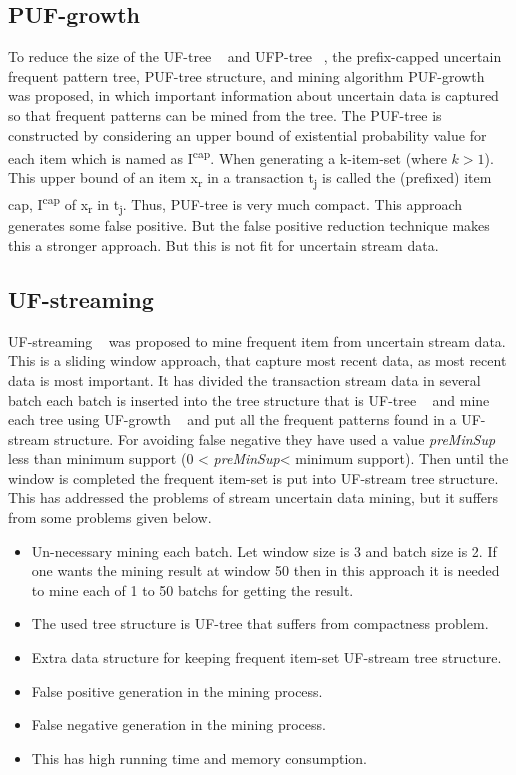     \subsection{PUF-growth}
    To reduce the size of the UF-tree ~\cite{uf_growth} and UFP-tree ~\cite{ufp_growth}, the preﬁx-capped uncertain frequent pattern tree, PUF-tree structure, and mining algorithm PUF-growth ~\cite{puf_growth} was proposed, in which important information about uncertain data is captured so that frequent patterns can be mined from the tree. The PUF-tree  is constructed by considering an upper bound of existential probability value for each item  which is named as I\textsuperscript{cap}. When generating a k-item-set (where $k>1$). This upper bound of an item x\textsubscript{r} in a transaction t\textsubscript{j} is called the (preﬁxed) item cap, I\textsuperscript{cap} of x\textsubscript{r} in t\textsubscript{j}. Thus, PUF-tree is very much compact. This approach generates some false positive. But the false positive reduction technique makes this a stronger approach. But this is not fit for uncertain stream data. 
    
    \subsection{UF-streaming}
    UF-streaming ~\cite{suf_growth} was proposed to mine frequent item from uncertain stream data. This is a sliding window approach, that capture most recent data, as most recent data is most important. It has divided the transaction stream data in several batch each batch is inserted into the tree structure that is UF-tree ~\cite{uf_growth} and mine each tree using UF-growth ~\cite{uf_growth} and put all the frequent patterns found in a UF-stream structure. For avoiding false negative they have used a value \emph{preMinSup} less than minimum support (0 < \emph{preMinSup}< minimum support). Then until the window is completed the frequent item-set is put into UF-stream tree structure. This has addressed the problems of stream uncertain data mining, but it suffers from some problems given below.
    \begin{itemize}
        \item Un-necessary mining each batch. Let window size is 3 and batch size is 2. If one wants the mining result at window 50 then in this approach it is needed to mine each of 1 to 50 batchs for getting the result.
        \item The used tree structure is UF-tree that suffers from compactness problem.
        \item Extra data structure for keeping frequent item-set UF-stream tree structure.
        \item False positive generation in the mining process.
        \item False negative generation in the mining process.
        \item This has high running time and memory consumption.
    \end{itemize}
    
